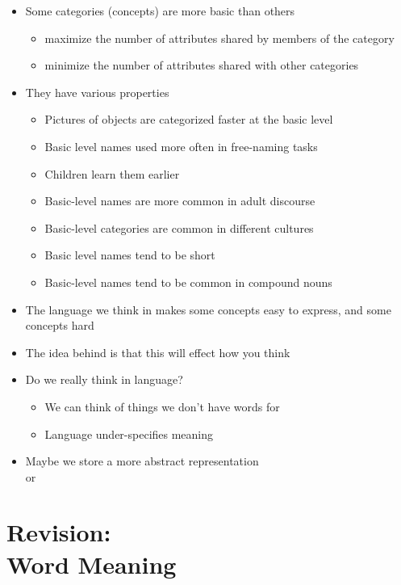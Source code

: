 \documentclass[headrule,footrule]{foils}
\begin{document}
\begin{itemize}
\item Some categories (concepts) are more basic than others
  \begin{itemize}
  \item  maximize the number of attributes shared by members of the category
  \item  minimize the number of attributes shared with other categories
  \end{itemize}
\item They have various properties
  \begin{itemize}
  \item Pictures of objects are categorized faster at the basic level
  \item Basic level names used more often in free-naming tasks
  \item Children learn them earlier
  \item Basic-level names are more common in adult discourse
  \item Basic-level categories are common in different cultures
  \item Basic level names tend to be short
  \item Basic-level names tend to be common in compound nouns
  \end{itemize}
\end{itemize}



\begin{itemize}
\item The language we think in makes some concepts easy to express,
  and some concepts hard
\item The idea behind  is that this will
  effect how you think
\item Do we really think in language? 
  \begin{itemize}
  \item We can think of things we don't have words for
  \item Language under-specifies meaning
  \end{itemize}
\item Maybe we store a more abstract representation
\\  or 
\end{itemize}


\section{Revision: \\ Word Meaning}
\end{document}
